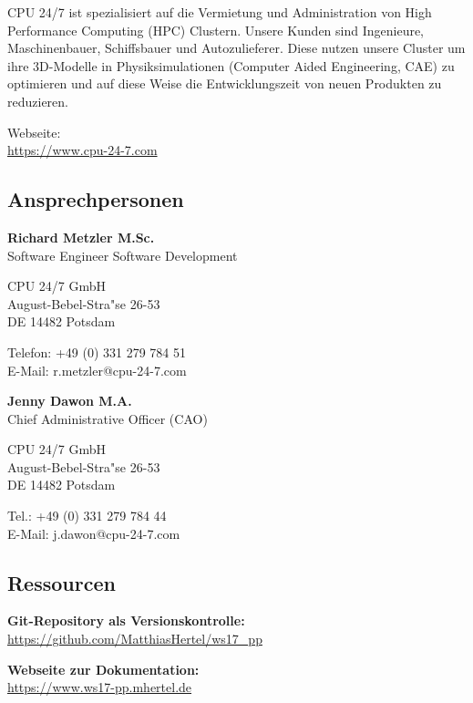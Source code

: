 \documentclass[12pt]{article}
\begin{document}
CPU 24/7 ist spezialisiert auf die Vermietung und Administration
von High Performance Computing (HPC) Clustern.
Unsere Kunden sind Ingenieure, Maschinenbauer, Schiffsbauer und Autozulieferer.
Diese nutzen unsere Cluster um ihre 3D-Modelle in Physiksimulationen (Computer Aided Engineering, CAE)
zu optimieren und auf diese Weise die Entwicklungszeit von neuen Produkten zu reduzieren.

Webseite:\\
\url{https://www.cpu-24-7.com}



\subsection{Ansprechpersonen}

\textbf{Richard Metzler M.Sc.}\\
Software Engineer Software Development

CPU 24/7 GmbH \\
August-Bebel-Stra"se 26-53\\
DE 14482 Potsdam

Telefon: +49 (0) 331 279 784 51 \\
E-Mail: r.metzler@cpu-24-7.com

\textbf{Jenny Dawon M.A.}\\
Chief Administrative Officer (CAO)

CPU 24/7 GmbH\\
August-Bebel-Stra"se 26-53\\
DE 14482 Potsdam

Tel.: +49 (0) 331 279 784 44\\
E-Mail: j.dawon@cpu-24-7.com

\subsection{Ressourcen}
\textbf{Git-Repository als Versionskontrolle:}\\
\url{https://github.com/MatthiasHertel/ws17_pp}

\textbf{Webseite zur Dokumentation:}\\
\url{https://www.ws17-pp.mhertel.de}
\end{document}
